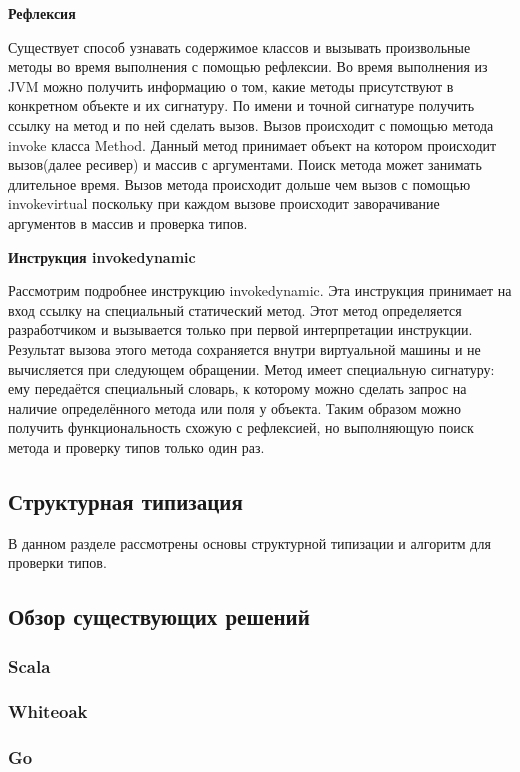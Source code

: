 \documentclass{spbau-diploma}
\begin{document}
\textbf{Рефлексия}

Существует способ узнавать содержимое классов и вызывать произвольные методы во время выполнения с помощью рефлексии. Во время выполнения из JVM можно получить информацию о том, какие методы присутствуют в конкретном объекте и их сигнатуру. По имени и точной сигнатуре получить ссылку на метод и по ней сделать вызов. Вызов происходит с помощью метода invoke класса Method. Данный метод принимает объект на котором происходит вызов(далее ресивер) и массив с аргументами. Поиск метода может занимать длительное время. Вызов метода происходит дольше чем вызов с помощью invokevirtual поскольку при каждом вызове происходит заворачивание аргументов в массив и проверка типов.

\textbf{Инструкция invokedynamic}

Рассмотрим подробнее инструкцию invokedynamic. Эта инструкция принимает на вход ссылку на специальный статический метод. Этот метод определяется разработчиком и вызывается только при первой интерпретации инструкции. Результат вызова этого метода сохраняется внутри виртуальной машины и не вычисляется при следующем обращении. Метод имеет специальную сигнатуру: ему передаётся специальный словарь, к которому можно сделать запрос на наличие определённого метода или поля у объекта. Таким образом можно получить функциональность схожую с рефлексией, но выполняющую поиск метода и проверку типов только один раз.

\subsection{Структурная типизация}
В данном разделе рассмотрены основы структурной типизации и алгоритм для проверки типов.

\subsection{Обзор существующих решений}
\subsubsection{Scala}
\subsubsection{Whiteoak}
\subsubsection{Go}
\end{document}
